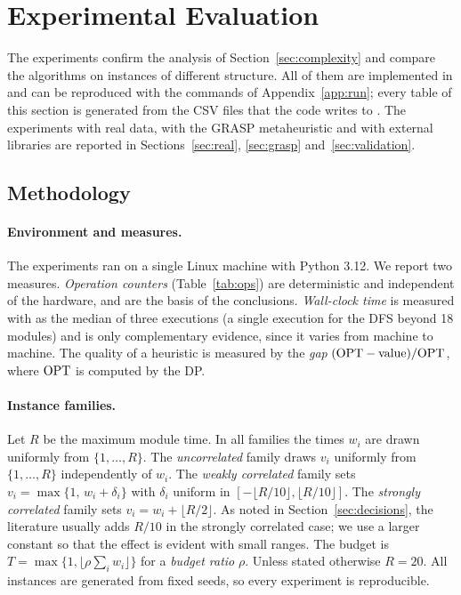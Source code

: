 \section{Experimental Evaluation}\label{sec:experiments}

The experiments confirm the analysis of Section~\ref{sec:complexity} and compare the algorithms on instances of different structure. All of them are implemented in  and can be reproduced with the commands of Appendix~\ref{app:run}; every table of this section is generated from the CSV files that the code writes to . The experiments with real data, with the GRASP metaheuristic and with external libraries are reported in Sections~\ref{sec:real}, \ref{sec:grasp} and~\ref{sec:validation}.

\subsection{Methodology}\label{sec:method}

\paragraph{Environment and measures.} The experiments ran on a single Linux machine with Python 3.12. We report two measures. \emph{Operation counters} (Table~\ref{tab:ops}) are deterministic and independent of the hardware, and are the basis of the conclusions. \emph{Wall-clock time} is measured with  as the median of three executions (a single execution for the DFS beyond 18 modules) and is only complementary evidence, since it varies from machine to machine. The quality of a heuristic is measured by the \emph{gap} $(\mathrm{OPT}-\mathrm{value})/\mathrm{OPT}$, where $\mathrm{OPT}$ is computed by the DP.

\paragraph{Instance families.} Let $R$ be the maximum module time. In all families the times $w_i$ are drawn uniformly from $\{1,\dots,R\}$. The \emph{uncorrelated} family draws $v_i$ uniformly from $\{1,\dots,R\}$ independently of $w_i$. The \emph{weakly correlated} family sets $v_i=\max\{1,\,w_i+\delta_i\}$ with $\delta_i$ uniform in $[-\lfloor R/10\rfloor,\lfloor R/10\rfloor]$. The \emph{strongly correlated} family sets $v_i=w_i+\lfloor R/2\rfloor$. As noted in Section~\ref{sec:decisions}, the literature usually adds $R/10$ in the strongly correlated case; we use a larger constant so that the effect is evident with small ranges. The budget is $T=\max\{1,\lfloor\rho\sum_iw_i\rfloor\}$ for a \emph{budget ratio} $\rho$. Unless stated otherwise $R=20$. All instances are generated from fixed seeds, so every experiment is reproducible.

